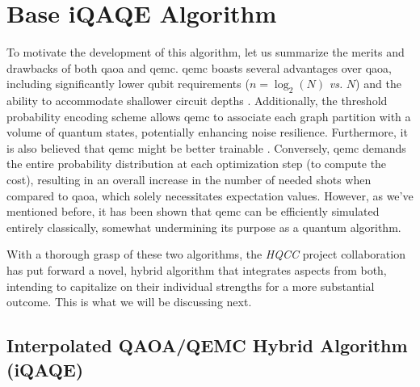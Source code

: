 
\chapter{Base iQAQE Algorithm}
\label{chapter:Base Algorithm}

To motivate the development of this algorithm, let us summarize the merits and drawbacks of both \acrshort{qaoa} and \acrshort{qemc}. \acrshort{qemc} boasts several advantages over \acrshort{qaoa}, including significantly lower qubit requirements ($n = \log_2(N)$ \textit{vs.} $N$) and the ability to accommodate shallower circuit depths \cite{tenecohen2023variational}. Additionally, the threshold probability encoding scheme allows \acrshort{qemc} to associate each graph partition with a volume of quantum states, potentially enhancing noise resilience. Furthermore, it is also believed that \acrshort{qemc} might be better trainable \cite{tenecohen2023variational}. Conversely, \acrshort{qemc} demands the entire probability distribution at each optimization step (to compute the cost), resulting in an overall increase in the number of needed shots when compared to \acrshort{qaoa}, which solely necessitates expectation values. However, as we've mentioned before, it has been shown \cite{tenecohen2023variational} that \acrshort{qemc} can be efficiently simulated entirely classically, somewhat undermining its purpose as a quantum algorithm.

With a thorough grasp of these two algorithms, the \textit{HQCC} project collaboration has put forward a novel, hybrid algorithm that integrates aspects from both, intending to capitalize on their individual strengths for a more substantial outcome. This is what we will be discussing next.

\section{Interpolated QAOA/QEMC Hybrid Algorithm (iQAQE)}
\label{section:iQAQE}

